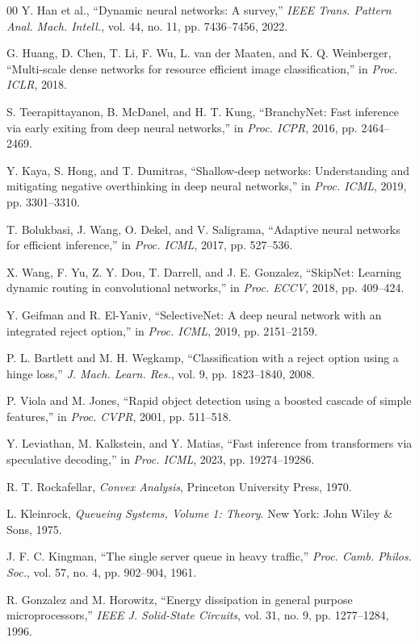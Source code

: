 \documentclass[conference]{IEEEtran}
\begin{document}
\begin{thebibliography}{00}
 Y. Han et al., ``Dynamic neural networks: A survey,'' \emph{IEEE Trans. Pattern Anal. Mach. Intell.}, vol. 44, no. 11, pp. 7436--7456, 2022.

 G. Huang, D. Chen, T. Li, F. Wu, L. van der Maaten, and K. Q. Weinberger, ``Multi-scale dense networks for resource efficient image classification,'' in \emph{Proc. ICLR}, 2018.

 S. Teerapittayanon, B. McDanel, and H. T. Kung, ``BranchyNet: Fast inference via early exiting from deep neural networks,'' in \emph{Proc. ICPR}, 2016, pp. 2464--2469.

 Y. Kaya, S. Hong, and T. Dumitras, ``Shallow-deep networks: Understanding and mitigating negative overthinking in deep neural networks,'' in \emph{Proc. ICML}, 2019, pp. 3301--3310.

 T. Bolukbasi, J. Wang, O. Dekel, and V. Saligrama, ``Adaptive neural networks for efficient inference,'' in \emph{Proc. ICML}, 2017, pp. 527--536.

 X. Wang, F. Yu, Z. Y. Dou, T. Darrell, and J. E. Gonzalez, ``SkipNet: Learning dynamic routing in convolutional networks,'' in \emph{Proc. ECCV}, 2018, pp. 409--424.

 Y. Geifman and R. El-Yaniv, ``SelectiveNet: A deep neural network with an integrated reject option,'' in \emph{Proc. ICML}, 2019, pp. 2151--2159.

 P. L. Bartlett and M. H. Wegkamp, ``Classification with a reject option using a hinge loss,'' \emph{J. Mach. Learn. Res.}, vol. 9, pp. 1823--1840, 2008.

 P. Viola and M. Jones, ``Rapid object detection using a boosted cascade of simple features,'' in \emph{Proc. CVPR}, 2001, pp. 511--518.

 Y. Leviathan, M. Kalkstein, and Y. Matias, ``Fast inference from transformers via speculative decoding,'' in \emph{Proc. ICML}, 2023, pp. 19274--19286.

 R. T. Rockafellar, \emph{Convex Analysis}, Princeton University Press, 1970.

 L. Kleinrock, \emph{Queueing Systems, Volume 1: Theory}. New York: John Wiley \& Sons, 1975.

 J. F. C. Kingman, ``The single server queue in heavy traffic,'' \emph{Proc. Camb. Philos. Soc.}, vol. 57, no. 4, pp. 902--904, 1961.

 R. Gonzalez and M. Horowitz, ``Energy dissipation in general purpose microprocessors,'' \emph{IEEE J. Solid-State Circuits}, vol. 31, no. 9, pp. 1277--1284, 1996.

\end{thebibliography}
\end{document}
